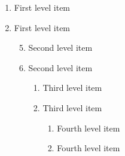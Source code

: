 \renewcommand{\labelenumii}{\Roman{enumii}}
 \begin{enumerate}
   \item First level item
   \item First level item
   \begin{enumerate}
     \setcounter{enumii}{4}
     \item Second level item
     \item Second level item
       \begin{enumerate}
       \item Third level item
       \item Third level item
         \begin{enumerate}
         \item Fourth level item
         \item Fourth level item
       \end{enumerate}
     \end{enumerate}
   \end{enumerate}
 \end{enumerate}

